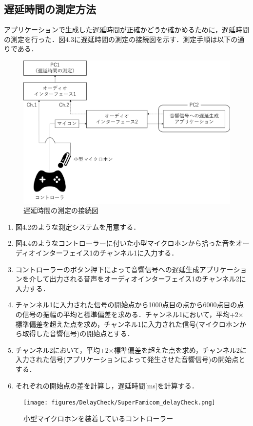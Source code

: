 \subsection{遅延時間の測定方法}
アプリケーションで生成した遅延時間が正確かどうか確かめるために，遅延時間の測定を行った．図4.3に遅延時間の測定の接続図を示す．測定手順は以下の通りである．
\begin{figure}[tb]
  \centering
  \includegraphics[scale=0.45]{figures/DelayCheck/DelayCheck_EX.png}
  \caption{遅延時間の測定の接続図}
\end{figure}
\begin{enumerate}[leftmargin=*]
  \item 図4.2のような測定システムを用意する．
  \item 図4.4のようなコントローラーに付いた小型マイクロホンから拾った音をオーディオインターフェイス1のチャンネル1に入力する．
  \item コントローラーのボタン押下によって音響信号への遅延生成アプリケーションを介して出力される音声をオーディオインターフェイス1のチャンネル2に入力する．
  \item チャンネル1に入力された信号の開始点から1000点目の点から6000点目の点の信号の振幅の平均と標準偏差を求める．チャンネル1において，平均+2×標準偏差を超えた点を求め，チャンネル1に入力された信号(マイクロホンから取得した音響信号)の開始点とする．
  \item チャンネル2において，平均+2×標準偏差を超えた点を求め，チャンネル2に入力された信号(アプリケーションによって発生させた音響信号)の開始点とする．
  \item それぞれの開始点の差を計算し，遅延時間[ms]を計算する．
\end{enumerate}
\begin{figure}[bt]
  \centering
  \texttt{[image: figures/DelayCheck/SuperFamicom\_delayCheck.png]}
  \caption{小型マイクロホンを装着しているコントローラー}
\end{figure}

